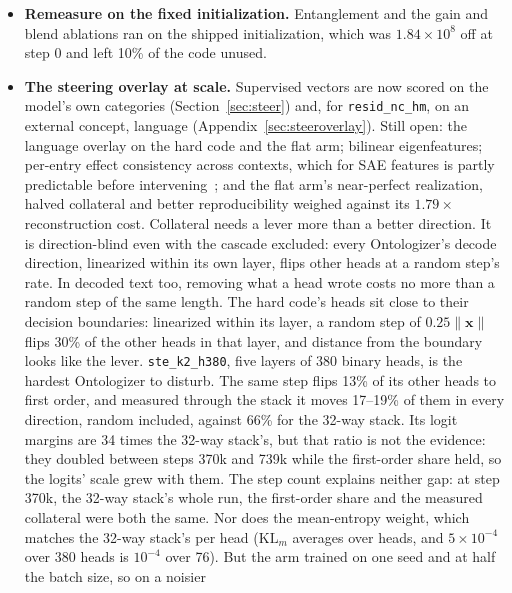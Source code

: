 \begin{itemize}
exact and matched unconstrained fibers' reconstruction on GPT-2. Fibers
are ported, but no SONAR run has used them; the recipe should be the
default there, scored at matched continuous capacity against SAEs
(rank-1 radial fibers already sit at 160 numbers per token).
\item \textbf{Remeasure on the fixed initialization.} Entanglement and
the gain and blend ablations ran on the shipped initialization, which
was $1.84\times10^8$ off at step 0 and left 10\% of the code unused.
\item \textbf{The steering overlay at scale.} Supervised vectors are now
scored on the model's own categories (Section~\ref{sec:steer}) and, for
\texttt{resid\_nc\_hm}, on an external concept, language
(Appendix~\ref{sec:steeroverlay}). Still open: the language overlay on
the hard code and the flat arm; bilinear eigenfeatures; per-entry effect
consistency across contexts, which for SAE features is partly predictable
before intervening~\cite{duan2026}; and the flat arm's near-perfect
realization, halved collateral and better reproducibility weighed
against its $1.79\times$ reconstruction cost. Collateral needs a lever
more than a better direction. It is direction-blind even with the
cascade excluded: every Ontologizer's decode direction, linearized
within its own layer, flips other heads at a random step's rate. In
decoded text too, removing what a head wrote costs no more than a random
step of the same length. The hard code's heads sit close to their
decision boundaries: linearized within its layer, a random step of
$0.25\lVert\mathbf{x}\rVert$ flips 30\% of the other heads in that
layer, and distance from the boundary looks like the lever.
\texttt{ste\_k2\_h380}, five layers of 380 binary heads, is the hardest
Ontologizer to disturb. The same step flips 13\% of its other heads to
first order, and measured through the stack it moves 17--19\% of them in
every direction, random included, against 66\% for the 32-way stack. Its
logit margins are 34 times the 32-way stack's, but that ratio is not the
evidence: they doubled between steps 370k and 739k while the first-order
share held, so the logits' scale grew with them. The step count explains
neither gap: at step 370k, the 32-way stack's whole run, the first-order
share and the measured collateral were both the same. Nor does the
mean-entropy weight, which matches the 32-way stack's per head ($\mathrm{KL}_m$ averages over
heads, and $5\times10^{-4}$ over 380 heads is $10^{-4}$ over 76). But the
arm trained on one seed and at half the batch size, so on a noisier

\end{itemize}

